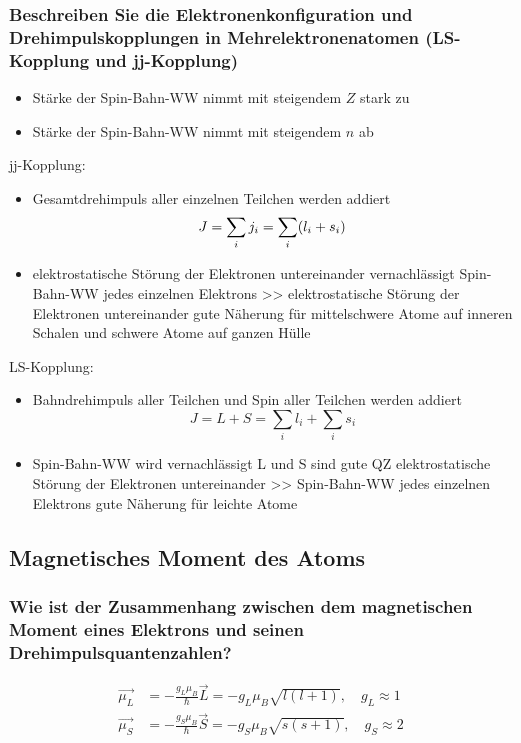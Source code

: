 \subsubsection{Beschreiben Sie die Elektronenkonfiguration und Drehimpulskopplungen in Mehrelektronenatomen (LS-Kopplung und jj-Kopplung)}
\begin{itemize}
    \item Stärke der Spin-Bahn-WW nimmt mit steigendem $Z$ stark zu
    \item Stärke der Spin-Bahn-WW nimmt mit steigendem $n$ ab
\end{itemize}
jj-Kopplung:
\begin{itemize}
    \item Gesamtdrehimpuls aller einzelnen Teilchen werden addiert
    \begin{equation*}
        J=\sum_i j_i=\sum_i(l_i+s_i)\\
    \end{equation*}
    \item elektrostatische Störung der Elektronen untereinander vernachlässigt
    \to Spin-Bahn-WW jedes einzelnen Elektrons >> elektrostatische Störung der Elektronen untereinander
    \iff gute Näherung für mittelschwere Atome auf inneren Schalen und schwere Atome auf ganzen Hülle
\end{itemize}
LS-Kopplung: 
\begin{itemize}
    \item Bahndrehimpuls aller Teilchen und Spin aller Teilchen werden addiert
        \begin{equation*}
            J=L+S=\sum_il_i + \sum_i s_i
        \end{equation*}
    \item Spin-Bahn-WW wird vernachlässigt \iff L und S sind gute QZ 
    \to elektrostatische Störung der Elektronen untereinander >> Spin-Bahn-WW jedes einzelnen Elektrons
    \to gute Näherung für leichte Atome
\end{itemize}


\subsection{Magnetisches Moment des Atoms}

\subsubsection{Wie ist der Zusammenhang zwischen dem magnetischen Moment eines Elektrons und seinen Drehimpulsquantenzahlen?}
\begin{align*}
    \vec{\mu_L}&=-\frac{g_L\mu_B}{\hbar}\vec{L}=-g_L\mu_B\sqrt{l(l+1)}, \quad g_L\approx 1\\
    \vec{\mu_S}&=-\frac{g_S\mu_B}{\hbar}\vec{S}=-g_S\mu_B\sqrt{s(s+1)}, \quad g_S\approx 2
\end{align*}
